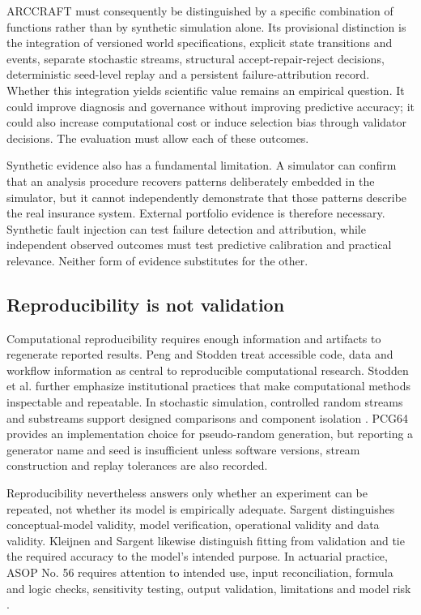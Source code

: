 ARCCRAFT must consequently be distinguished by a specific combination of functions rather than by synthetic simulation alone. Its provisional distinction is the integration of versioned world specifications, explicit state transitions and events, separate stochastic streams, structural accept-repair-reject decisions, deterministic seed-level replay and a persistent failure-attribution record. Whether this integration yields scientific value remains an empirical question. It could improve diagnosis and governance without improving predictive accuracy; it could also increase computational cost or induce selection bias through validator decisions. The evaluation must allow each of these outcomes.

Synthetic evidence also has a fundamental limitation. A simulator can confirm that an analysis procedure recovers patterns deliberately embedded in the simulator, but it cannot independently demonstrate that those patterns describe the real insurance system. External portfolio evidence is therefore necessary. Synthetic fault injection can test failure detection and attribution, while independent observed outcomes must test predictive calibration and practical relevance. Neither form of evidence substitutes for the other.

\subsection{Reproducibility is not validation}\label{sec:reproducibility-is-not-validation}

Computational reproducibility requires enough information and artifacts to regenerate reported results. Peng \cite{Peng2011} and Stodden \cite{Stodden2015} treat accessible code, data and workflow information as central to reproducible computational research. Stodden et al. \cite{Stodden2016} further emphasize institutional practices that make computational methods inspectable and repeatable. In stochastic simulation, controlled random streams and substreams support designed comparisons and component isolation \cite{LEcuyer2002}. PCG64 provides an implementation choice for pseudo-random generation, but reporting a generator name and seed is insufficient unless software versions, stream construction and replay tolerances are also recorded.

Reproducibility nevertheless answers only whether an experiment can be repeated, not whether its model is empirically adequate. Sargent \cite{Sargent2013} distinguishes conceptual-model validity, model verification, operational validity and data validity. Kleijnen and Sargent \cite{Kleijnen2000} likewise distinguish fitting from validation and tie the required accuracy to the model's intended purpose. In actuarial practice, ASOP No. 56 requires attention to intended use, input reconciliation, formula and logic checks, sensitivity testing, output validation, limitations and model risk \cite{ASB2020}.

